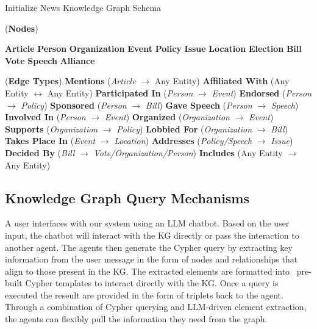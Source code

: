 \documentclass{scrartcl}
\begin{document}
\renewcommand{\thealgocf}{3}
\begin{algorithm}[h!]
\caption{Initialize News Knowledge Graph Schema}


\Define (\textbf{Nodes})
{

    {\textbf{Article}\;
    \textbf{Person}\;
    \textbf{Organization}\;
    \textbf{Event}\;
    \textbf{Policy}\;
    \textbf{Issue}\;
    \textbf{Location}\;
    \textbf{Election}\;
    \textbf{Bill}\;
    \textbf{Vote}\;
    \textbf{Speech}\;
    \textbf{Alliance}\;}
}

\Define (\textbf{Edge Types})
{
    \textbf{Mentions} (\textit{Article} $\rightarrow$ Any Entity)\;
    \textbf{Affiliated With} (Any Entity $\leftrightarrow$ Any Entity)\;
    \textbf{Participated In} (\textit{Person} $\rightarrow$ \textit{Event})\;
    \textbf{Endorsed} (\textit{Person} $\rightarrow$ \textit{Policy})\;
    \textbf{Sponsored} (\textit{Person} $\rightarrow$ \textit{Bill})\;
    \textbf{Gave Speech} (\textit{Person} $\rightarrow$ \textit{Speech})\;
    \textbf{Involved In} (\textit{Person} $\rightarrow$ \textit{Event})\;
    \textbf{Organized} (\textit{Organization} $\rightarrow$ \textit{Event})\;
    \textbf{Supports} (\textit{Organization} $\rightarrow$ \textit{Policy})\;
    \textbf{Lobbied For} (\textit{Organization} $\rightarrow$ \textit{Bill})\;
    \textbf{Takes Place In} (\textit{Event} $\rightarrow$ \textit{Location})\;
    \textbf{Addresses} (\textit{Policy/Speech} $\rightarrow$ \textit{Issue})\;
    \textbf{Decided By} (\textit{Bill} $\rightarrow$ \textit{Vote/Organization/Person})\;
    \textbf{Includes} (Any Entity $\rightarrow$ Any Entity)\;
}


\end{algorithm}


\subsection{ Knowledge Graph Query Mechanisms}
A user interfaces with our system using an LLM chatbot. Based on the user input, the chatbot will interact with the KG directly or pass the interaction to another agent. The agents then generate the Cypher query by extracting key information from the user message in the form of nodes and relationships that align to those present in the KG. The extracted elements are formatted into  pre-built Cypher templates to interact directly with the KG. Once a query is executed the reseult are provided in the form of triplets back to the agent. Through a combination of Cypher querying and LLM-driven element extraction, the agents can flexibly pull the information they need from the graph.
 
\end{document}
